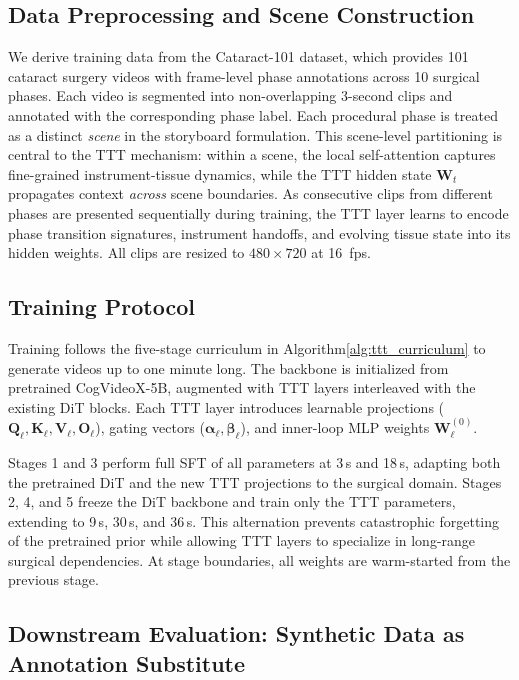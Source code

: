 \documentclass[runningheads]{llncs}
\begin{document}
\subsection{Data Preprocessing and Scene Construction}

We derive training data from the Cataract-101 dataset, which provides 101 cataract surgery videos with frame-level phase annotations across 10 surgical phases. Each video is segmented into non-overlapping 3-second clips and annotated with the corresponding phase label. Each procedural phase is treated as a distinct \textit{scene} in the storyboard formulation. This scene-level partitioning is central to the TTT mechanism: within a scene, the local self-attention captures fine-grained instrument-tissue dynamics, while the TTT hidden state $\mathbf{W}_t$ propagates context \textit{across} scene boundaries. As consecutive clips from different phases are presented sequentially during training, the TTT layer learns to encode phase transition signatures, instrument handoffs, and evolving tissue state into its hidden weights. All clips are resized to $480 \times 720$ at 16~fps.

\subsection{Training Protocol}

Training follows the five-stage curriculum in Algorithm\ref{alg:ttt_curriculum} to generate videos up to one minute long. The backbone is initialized from pretrained CogVideoX-5B, augmented with TTT layers interleaved with the existing DiT blocks. Each TTT layer introduces learnable projections ($\mathbf{Q}_\ell, \mathbf{K}_\ell, \mathbf{V}_\ell, \mathbf{O}_\ell$), gating vectors ($\bm{\alpha}_\ell, \bm{\beta}_\ell$), and inner-loop MLP weights $\mathbf{W}_\ell^{(0)}$.

Stages 1 and 3 perform full SFT of all parameters at 3\,s and 18\,s, adapting both the pretrained DiT and the new TTT projections to the surgical domain. Stages 2, 4, and 5 freeze the DiT backbone and train only the TTT parameters, extending to 9\,s, 30\,s, and 36\,s. This alternation prevents catastrophic forgetting of the pretrained prior while allowing TTT layers to specialize in long-range surgical dependencies. At stage boundaries, all weights are warm-started from the previous stage.

\subsection{Downstream Evaluation: Synthetic Data as Annotation Substitute}
\end{document}
